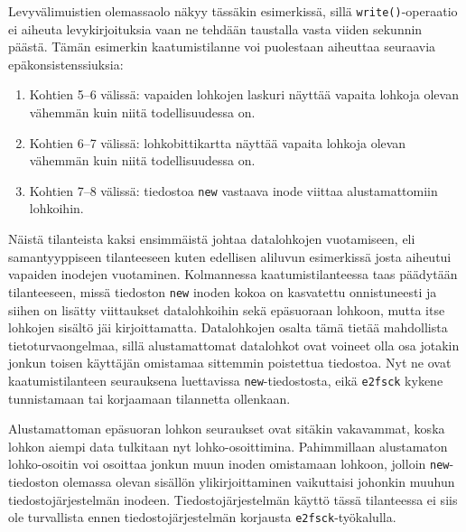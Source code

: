 Levyvälimuistien olemassaolo näkyy tässäkin esimerkissä,
sillä \texttt{write()}-operaatio ei aiheuta levykirjoituksia vaan ne tehdään taustalla vasta viiden sekunnin päästä.
%
Tämän esimerkin kaatumistilanne voi puolestaan aiheuttaa seuraavia epäkonsistenssiuksia:
\begin{enumerate}
    \item{Kohtien 5--6 välissä: vapaiden lohkojen laskuri näyttää vapaita lohkoja olevan vähemmän kuin niitä todellisuudessa on.}
    \item{Kohtien 6--7 välissä: lohkobittikartta näyttää vapaita lohkoja olevan vähemmän kuin niitä todellisuudessa on.}
    \item{Kohtien 7--8 välissä: tiedostoa \texttt{new} vastaava inode viittaa alustamattomiin lohkoihin.}
\end{enumerate}
%
Näistä tilanteista kaksi ensimmäistä johtaa datalohkojen vuotamiseen,
eli samantyyppiseen tilanteeseen kuten edellisen aliluvun esimerkissä josta aiheutui vapaiden inodejen vuotaminen.
Kolmannessa kaatumistilanteessa taas päädytään tilanteeseen,
missä tiedoston \texttt{new} inoden kokoa on kasvatettu onnistuneesti ja siihen on lisätty viittaukset datalohkoihin sekä epäsuoraan lohkoon,
mutta itse lohkojen sisältö jäi kirjoittamatta.
Datalohkojen osalta tämä tietää mahdollista tietoturvaongelmaa,
sillä alustamattomat datalohkot ovat voineet olla osa jotakin jonkun toisen käyttäjän omistamaa sittemmin poistettua tiedostoa.
Nyt ne ovat kaatumistilanteen seurauksena luettavissa \texttt{new}-tiedostosta,
eikä \texttt{e2fsck} kykene tunnistamaan tai korjaamaan tilannetta ollenkaan.

Alustamattoman epäsuoran lohkon seuraukset ovat sitäkin vakavammat,
koska lohkon aiempi data tulkitaan nyt lohko-osoittimina.
Pahimmillaan alustamaton lohko-osoitin voi osoittaa jonkun muun inoden omistamaan lohkoon,
jolloin \texttt{new}-tiedoston olemassa olevan sisällön ylikirjoittaminen vaikuttaisi johonkin muuhun tiedostojärjestelmän inodeen.
Tiedostojärjestelmän käyttö tässä tilanteessa ei siis ole turvallista ennen tiedostojärjestelmän korjausta \texttt{e2fsck}-työkalulla.


